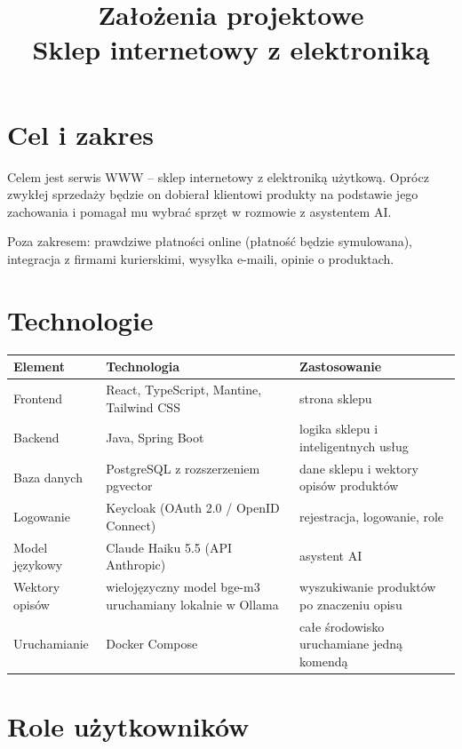 \documentclass[11pt,a4paper]{article}
\title{Założenia projektowe\\[4pt]\large Sklep internetowy z elektroniką}
\author{}
\date{}
\begin{document}
\maketitle
\vspace{-2em}
\tableofcontents

\section{Cel i zakres}

Celem jest serwis WWW -- sklep internetowy z elektroniką użytkową. Oprócz zwykłej sprzedaży będzie on dobierał
klientowi produkty na podstawie jego zachowania i pomagał mu wybrać sprzęt w rozmowie z asystentem AI.

Poza zakresem: prawdziwe płatności online (płatność będzie symulowana), integracja z firmami kurierskimi,
wysyłka e-maili, opinie o produktach.

\section{Technologie}

{\small
\begin{tabularx}{\textwidth}{P{2.8cm}LL}
\toprule
\textbf{Element} & \textbf{Technologia} & \textbf{Zastosowanie} \\
\midrule
Frontend & React, TypeScript, Mantine, Tailwind CSS & strona sklepu \\
Backend & Java, Spring Boot & logika sklepu i inteligentnych usług \\
Baza danych & PostgreSQL z rozszerzeniem pgvector & dane sklepu i wektory opisów produktów \\
Logowanie & Keycloak (OAuth 2.0 / OpenID Connect) & rejestracja, logowanie, role \\
Model językowy & Claude Haiku 5.5 (API Anthropic) & asystent AI \\
Wektory opisów & wielojęzyczny model bge-m3 uruchamiany lokalnie w Ollama & wyszukiwanie produktów po
znaczeniu opisu \\
Uruchamianie & Docker Compose & całe środowisko uruchamiane jedną komendą \\
\bottomrule
\end{tabularx}\par\medskip
}

\section{Role użytkowników}
\end{document}
